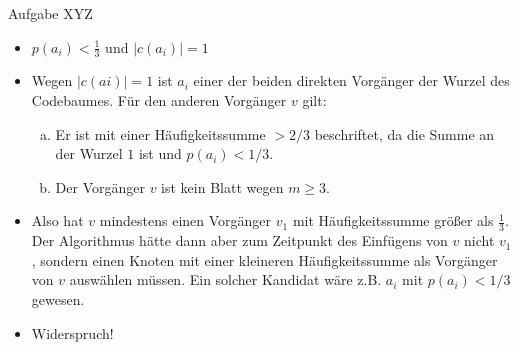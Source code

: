 \begin{frame}[allowframebreaks]{Aufgabe \thesection}{XYZ}
  \begin{requirementsnoinc}
    \begin{itemize}
      \item $p(a_{i})< \frac{1}{3}$ und $|c(a_{i})|=1$
    \end{itemize}
  \end{requirementsnoinc}
  \begin{solutionnoinc}
    \begin{itemize}
      \item Wegen $|c(ai )| = 1$ ist $a_i$ einer der beiden direkten Vorgänger der Wurzel des Codebaumes. Für den anderen Vorgänger $v$ gilt:
      \begin{enumerate}[a)]
        \item Er ist mit einer Häufigkeitssumme $> 2/3$ beschriftet, da die Summe an der Wurzel $1$ ist und $p(a_i) < 1/3$.
        \item Der Vorgänger $v$ ist kein Blatt wegen $m \ge 3$.
      \end{enumerate}
      \item Also hat $v$ mindestens einen Vorgänger $v_1$ mit Häufigkeitssumme größer als $\frac{1}{3}$. Der Algorithmus hätte dann aber zum Zeitpunkt des Einfügens von $v$ nicht $v_1$, sondern einen Knoten mit einer kleineren Häufigkeitssumme als Vorgänger von $v$ auswählen müssen. Ein solcher Kandidat wäre z.B. $a_i$ mit $p(a_i) < 1/3$ gewesen.
      \item Widerspruch!
    \end{itemize}
  \end{solutionnoinc}
  \begin{solutionnoinc}
  \end{solutionnoinc}
\end{frame}

